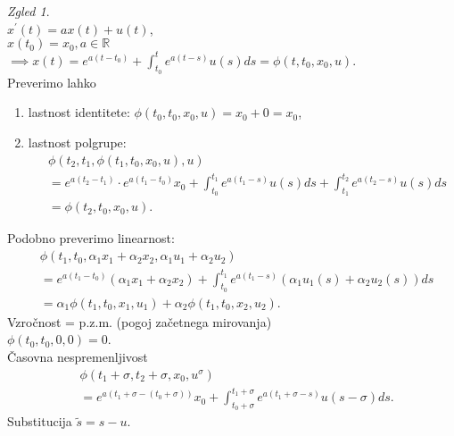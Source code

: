 \documentclass[a4paper, 12pt]{book}
\theoremstyle{definition}
\theoremstyle{remark}
\newtheorem*{exmp}{Zgled}
\newcommand{\R}{\mathbb{R}}
\begin{document}
\begin{exmp} \text{} \\
    $x^{'}(t) = a x(t) + u(t)$, \\
    $x(t_0) = x_0, a \in \R$ \\
    $\implies x(t) = e^{a(t-t_0)} + \int_{t_0}^t e^{a(t-s)} u(s) ds = \phi(t, t_0, x_0, u)$. \\
    Preverimo lahko
    \begin{enumerate}[label=\alph*)]
        \item lastnost identitete: $\phi(t_0, t_0, x_0, u) = x_0 + 0 = x_0$,
        \item lastnost polgrupe:
            \begin{align*}
                &\phi(t_2, t_1, \phi(t_1, t_0, x_0, u), u) \\
                &= e^{a(t_2-t_1)} \cdot e^{a(t_1-t_0)} x_0
                + \int_{t_0}^{t_1} e^{a(t_1-s)} u(s) ds + \int_{t_1}^{t_2} e^{a(t_2-s)} u(s) ds \\
                &= \phi(t_2, t_0, x_0, u).
            \end{align*}
    \end{enumerate}
    Podobno preverimo linearnost:
    \begin{align*}
        &\phi(t_1, t_0, \alpha_1 x_1 + \alpha_2 x_2, \alpha_1 u_1 + \alpha_2 u_2) \\
        &= e^{a(t_1-t_0)}(\alpha_1 x_1 + \alpha_2 x_2) + \int_{t_0}^{t_1} e^{a(t_1-s)} (\alpha_1 u_1(s) + \alpha_2 u_2(s)) ds \\
        &= \alpha_1 \phi(t_1, t_0, x_1, u_1) + \alpha_2 \phi(t_1, t_0, x_2, u_2).
    \end{align*}
    Vzročnost = p.z.m. (pogoj začetnega mirovanja) \\
    $\phi(t_0, t_0, 0, 0) = 0$. \\
    Časovna nespremenljivost
    \begin{align*}
        &\phi(t_1 + \sigma, t_2 + \sigma, x_0, u^{\sigma}) \\
        &= e^{a(t_1+\sigma-(t_0+\sigma))} x_0 + \int_{t_0+\sigma}^{t_1+\sigma} e^{a(t_1+\sigma-s)} u(s-\sigma) ds.
    \end{align*}
    Substitucija $\tilde{s} = s - u$.
\end{exmp}




%
%



\end{document}
